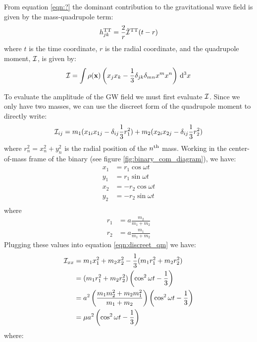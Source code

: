 From equation \ref{eqn:?} the dominant contribution to the gravitational wave field is given by the mass-quadrupole term:
\begin{equation}
\label{eqn:h_mass_quad}
h^{\TT}_{jk} = \frac{2}{r} \ddot{\qI}^\TT(t - r)
\end{equation}
where $t$ is the time coordinate, $r$ is the radial coordinate, and the quadrupole moment, $\mathcal{I}$, is given by:
\begin{equation}
\label{eqn:quad_moment}
\qI = \int \rho(\mathbf{x})\left( x_j x_k - \frac{1}{3} \delta_{jk} \delta_{mn} x^{m} x^{n} \right) \d^3 x
\end{equation}

To evaluate the amplitude of the \ac{GW} field we must first evaluate $\mathcal{I}$. Since we only have two masses, we can use the discreet form of the quadrupole moment to directly write:
\begin{equation}
\label{eqn:discreet_qm}
\qI_{ij} = m_1(x_{1i}x_{1j} - \delta_{ij}\frac{1}{3} r_1^2) + m_2(x_{2i}x_{2j} - \delta_{ij}\frac{1}{3}r_2^2)
\end{equation}
where $r_n^2 = x_n^2 + y_n^2$ is the radial position of the $n^{\mathrm{th}}$ mass. Working in the center-of-mass frame of the binary (see figure \ref{fig:binary_com_diagram}), we have:
\begin{align*}
x_1 &= r_1 \cos \omega t \\
y_1 &= r_1 \sin \omega t \\
x_2 &= - r_2 \cos \omega t \\
y_2 &= - r_2 \sin \omega t \\
\end{align*}
where
\begin{align}
r_1 &= a\frac{m_2}{m_1 + m_2} \\
r_2 &= a \frac{m_1}{m_1 + m_2}
\end{align}
Plugging these values into equation \ref{eqn:discreet_qm} we have:
\begin{align}
\mathcal{I}_{xx} &= m_1 x_1^2 + m_2 x_2^2 - \frac{1}{3}(m_1r_1^2 + m_2r_2^2) \nonumber \\
         &= (m_1r_1^2 + m_2r_2^2)\left(\cos^2 \omega t - \frac{1}{3}\right) \nonumber \\
         &= a^2\left(\frac{m_1m_2^2 + m_2m_1^2}{m_1+m_2}\right)\left(\cos^2 \omega t - \frac{1}{3}\right) \nonumber \\
         &= \mu a^2 \left(\cos^2 \omega t - \frac{1}{3} \right)
\end{align}
where:
